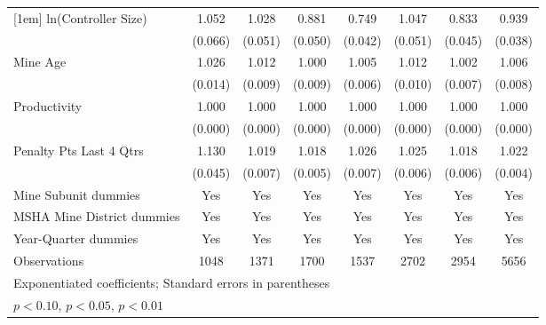 {\begin{tabular}{l*{7}{c}}
[1em]
ln(Controller Size)      &       1.052         &       1.028         &       0.881\sym{**} &       0.749\sym{***}&       1.047         &       0.833\sym{***}&       0.939         \\
                         &     (0.066)         &     (0.051)         &     (0.050)         &     (0.042)         &     (0.051)         &     (0.045)         &     (0.038)         \\
[1em]
Mine Age                 &       1.026\sym{*}  &       1.012         &       1.000         &       1.005         &       1.012         &       1.002         &       1.006         \\
                         &     (0.014)         &     (0.009)         &     (0.009)         &     (0.006)         &     (0.010)         &     (0.007)         &     (0.008)         \\
[1em]
Productivity             &       1.000         &       1.000         &       1.000         &       1.000         &       1.000         &       1.000         &       1.000         \\
                         &     (0.000)         &     (0.000)         &     (0.000)         &     (0.000)         &     (0.000)         &     (0.000)         &     (0.000)         \\
[1em]
Penalty Pts Last 4 Qtrs  &       1.130\sym{***}&       1.019\sym{***}&       1.018\sym{***}&       1.026\sym{***}&       1.025\sym{***}&       1.018\sym{***}&       1.022\sym{***}\\
                         &     (0.045)         &     (0.007)         &     (0.005)         &     (0.007)         &     (0.006)         &     (0.006)         &     (0.004)         \\
[1em]
Mine Subunit dummies     &         Yes         &         Yes         &         Yes         &         Yes         &         Yes         &         Yes         &         Yes         \\
[1em]
MSHA Mine District dummies&         Yes         &         Yes         &         Yes         &         Yes         &         Yes         &         Yes         &         Yes         \\
[1em]
Year-Quarter dummies     &         Yes         &         Yes         &         Yes         &         Yes         &         Yes         &         Yes         &         Yes         \\
\hline
Observations             &        1048         &        1371         &        1700         &        1537         &        2702         &        2954         &        5656         \\
\hline\hline
\multicolumn{8}{l}{\footnotesize Exponentiated coefficients; Standard errors in parentheses}\\
\multicolumn{8}{l}{\footnotesize \sym{*} \(p<0.10\), \sym{**} \(p<0.05\), \sym{***} \(p<0.01\)}\\
\end{tabular}
}
